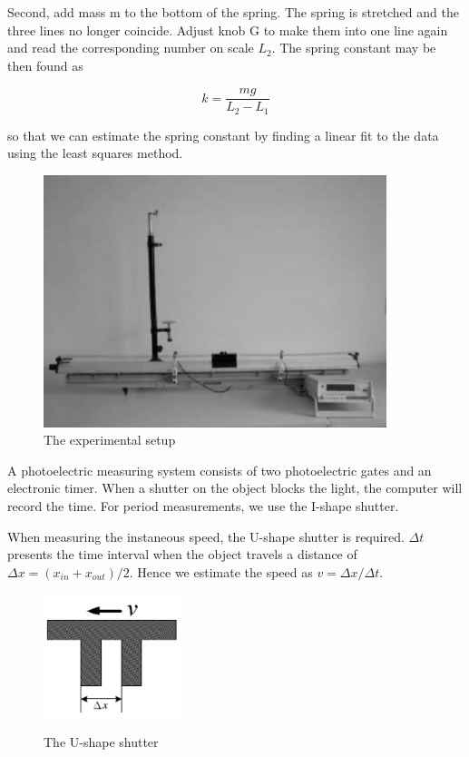 Second, add mass m to the bottom of the spring. The spring is stretched and the
three lines no longer coincide. Adjust knob G to make them into one line again
and read the corresponding number on scale $L_2$. The spring constant may be
then found as 

\begin{equation}
k=\frac{mg}{L_2-L_1}
\end{equation}

so that we can estimate the spring constant by finding a linear fit to the data
using the least squares method.

\begin{figure}[h]
\centering
\label{airtrack}
\includegraphics[width=10cm]{fig/eair}
\caption{The experimental setup}
\end{figure}

A photoelectric measuring system consists of two photoelectric gates and an
electronic timer. When a shutter on the object blocks the light, the computer
will record the time. For period measurements, we use the I-shape shutter. 

When measuring the instaneous speed, the U-shape shutter is required. $\Delta t$
presents the time interval when the object travels a distance of $\Delta
x=(x_{in}+x_{out})/2$. Hence we estimate the speed as $v=\Delta x/\Delta t$. 

\begin{figure}[H]
\centering
\includegraphics[width=4cm]{fig/eushape}
\label{ushape}
\caption{The U-shape shutter}
\end{figure}
